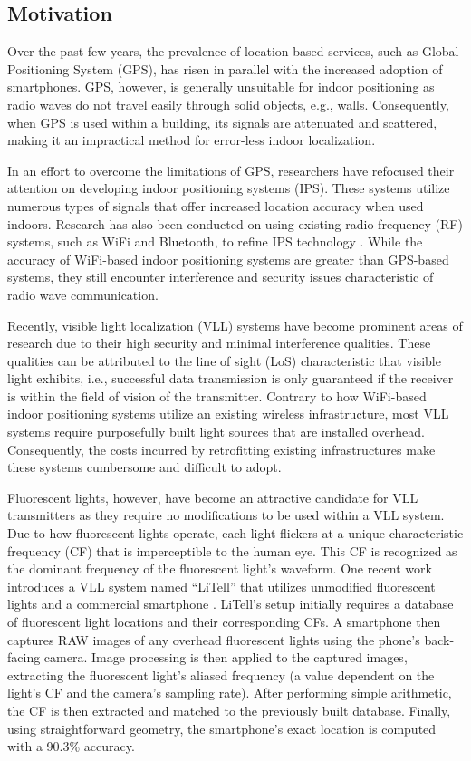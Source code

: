 \documentclass[conference]{IEEEtran}
\begin{document}
\subsection{Motivation}

Over the past few years, the prevalence of location based services, such as Global Positioning System (GPS), has risen in parallel with the increased adoption of smartphones. GPS, however, is generally unsuitable for indoor positioning as radio waves do not travel easily through solid objects, e.g., walls. Consequently, when GPS is used within a building, its signals are attenuated and scattered, making it an impractical method for error-less indoor localization.

In an effort to overcome the limitations of GPS, researchers have refocused their attention on developing indoor positioning systems (IPS). These systems utilize numerous types of signals that offer increased location accuracy when used indoors. Research has also been conducted on using existing radio frequency  (RF) systems, such as WiFi and Bluetooth, to refine IPS technology \cite{do2016depth}. While the accuracy of WiFi-based indoor positioning systems are greater than GPS-based systems, they still encounter interference and security issues characteristic of radio wave communication.

Recently, visible light localization (VLL) systems have become prominent areas of research due to their high security and minimal interference qualities. These qualities can be attributed to the line of sight (LoS) characteristic that visible light exhibits, i.e., successful data transmission is only guaranteed if the receiver is within the field of vision of the transmitter. Contrary to how WiFi-based indoor positioning systems utilize an existing wireless infrastructure, most VLL systems require purposefully built light sources that are installed overhead. Consequently, the costs incurred by retrofitting existing infrastructures make these systems cumbersome and difficult to adopt.

Fluorescent lights, however, have become an attractive candidate for VLL transmitters as they require no modifications to be used within a VLL system. Due to how fluorescent lights operate, each light flickers at a unique characteristic frequency (CF) that is imperceptible to the human eye. This CF is recognized as the dominant frequency of the fluorescent light's waveform. One recent work introduces a VLL system named ``LiTell'' that utilizes unmodified fluorescent lights and a commercial smartphone \cite{zhang2016litell}. LiTell's setup initially requires a database of fluorescent light locations and their corresponding CFs. A smartphone then captures RAW images of any overhead fluorescent lights using the phone's back-facing camera. Image processing is then applied to the captured images, extracting the fluorescent light's aliased frequency (a value dependent on the light's CF and the camera's sampling rate). After performing simple arithmetic, the CF is then extracted and matched to the previously built database. Finally, using straightforward geometry, the smartphone's exact location is computed with a 90.3\% accuracy.
\end{document}
